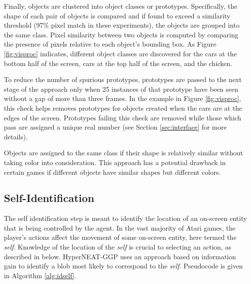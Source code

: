 \documentclass{acm_proc_article-sp}
\begin{document}
Finally, objects are clustered into object classes or prototypes. Specifically, the shape of each pair of objects is compared and if found to exceed a similarity threshold (97\% pixel match in these experiments), the objects are grouped into the same class. Pixel similarity between two objects is computed by comparing the presence of pixels relative to each object's bounding box. As Figure \ref{fig:visproc} indicates, different object classes are discovered for the cars at the bottom half of the screen, cars at the top half of the screen, and the chicken. 

To reduce the number of spurious prototypes, prototypes are passed to the next stage of the approach only when 25 instances of that prototype have been seen without a gap of more than three frames. In the example in Figure \ref{fig:visproc}, this check helps removes prototypes for objects created when the cars are at the edges of the screen. Prototypes failing this check are removed while those which pass are assigned a unique real number (see Section \ref{sec:interface} for more details).

Objects are assigned to the same class if their shape is relatively similar without taking color into consideration. This approach has a potential drawback in certain games if different objects have similar shapes but different colors. 

\subsection{Self-Identification}
The self identification step is meant to identify the location of an on-screen entity that is being controlled by the agent. In the vast majority of Atari games, the player's actions affect the movement of some on-screen entity, here termed the \textit{self}. Knowledge of the location of the \textit{self} is crucial to selecting an action, as described in below. HyperNEAT-GGP uses an approach based on information gain to identify a blob most likely to correspond to the \textit{self}. Pseudocode is given in Algorithm \ref{alg:idself}.
\end{document}
